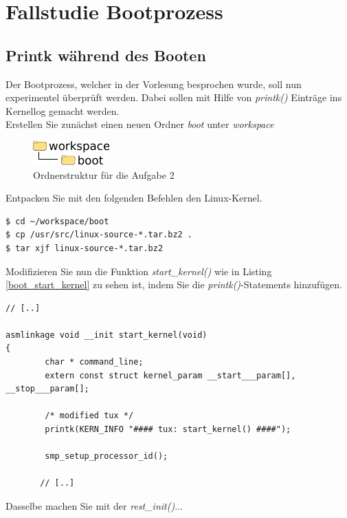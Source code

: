 \section{Fallstudie Bootprozess}

\subsection{Printk während des Booten}

Der Bootprozess, welcher in der Vorlesung besprochen wurde, soll nun experimentel überprüft werden.
Dabei sollen mit Hilfe von \emph{printk()} Einträge ins Kernellog gemacht werden. \\

Erstellen Sie zunächst einen neuen Ordner \emph{boot} unter \emph{workspace}

\begin{figure}[h!]
   \begin{center}
      \includegraphics{images/boot_dirs}
   \end{center}
   \caption{Ordnerstruktur für die Aufgabe 2}
\end{figure}

Entpacken Sie mit den folgenden Befehlen den Linux-Kernel.

\begin{lstlisting}
$ cd ~/workspace/boot
$ cp /usr/src/linux-source-*.tar.bz2 .
$ tar xjf linux-source-*.tar.bz2
\end{lstlisting}

Modifizieren Sie nun die Funktion \emph{start\_kernel()} wie in Listing \ref{boot_start_kernel} zu sehen ist,
indem Sie die \emph{printk()}-Statements hinzufügen.

\begin{lstlisting}[label=boot_start_kernel,caption=init/main.c]
// [..]

asmlinkage void __init start_kernel(void)
{
        char * command_line;
        extern const struct kernel_param __start___param[], __stop___param[];

        /* modified tux */
        printk(KERN_INFO "#### tux: start_kernel() ####");

        smp_setup_processor_id();

       // [..]
\end{lstlisting}

Dasselbe machen Sie mit der \emph{rest\_init()}...

